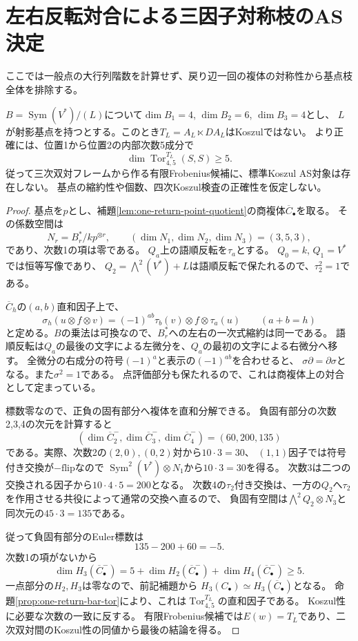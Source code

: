 \section{左右反転対合による三因子対称枝のAS決定}
\label{sec:partial-symmetric-as}
ここでは一般点の大行列階数を計算せず、戻り辺一回の複体の対称性から基点枝全体を排除する。

\begin{theorem}[基点を持つ三因子対称切断の普遍的非Koszul性]
\label{thm:partial-symmetric-basepoint-exclusion}
$B=\operatorname{Sym}(V^*)/(L)$について$\dim B_1=4$, $\dim B_2=6$, $\dim B_3=4$とし、
$L$が射影基点を持つとする。このとき$T_L=A_L\ltimes D A_L$はKoszulではない。
より正確には、位置1から位置2の内部次数5成分で
\[
 \dim\operatorname{Tor}^{T_L}_{4,5}(S,S)\geq5.
\]
従って三次双対フレームから作る有限Frobenius候補に、標準Koszul AS対象は存在しない。
基点の縮約性や個数、四次Koszul検査の正確性を仮定しない。
\end{theorem}
\begin{proof}
基点を$p$とし、補題\ref{lem:one-return-point-quotient}の商複体$\overline C_\bullet$を取る。
その係数空間は
\[
 N_r=B_r^*/k p^{\otimes r},\qquad
 (\dim N_1,\dim N_2,\dim N_3)=(3,5,3),
\]
であり、次数1の項は零である。
$Q_a$上の語順反転を$\tau_a$とする。
$Q_0=k$, $Q_1=V^*$では恒等写像であり、
$Q_2=\bigwedge^2(V^*)+L$は語順反転で保たれるので、$\tau_2^2=1$である。

$\overline C_h$の$(a,b)$直和因子上で、
\[
 \sigma_h(u\otimes f\otimes v)
   =(-1)^{ab}\tau_b(v)\otimes f\otimes\tau_a(u)
 \qquad(a+b=h)
\]
と定める。$B$の乗法は可換なので、$B_r^*$への左右の一次式縮約は同一である。
語順反転は$Q_a$の最後の文字による左微分を、$Q_a$の最初の文字による右微分へ移す。
全微分の右成分の符号$(-1)^a$と表示の$(-1)^{ab}$を合わせると、
$\sigma\partial=\partial\sigma$となる。また$\sigma^2=1$である。
点評価部分も保たれるので、これは商複体上の対合として定まっている。

標数零なので、正負の固有部分へ複体を直和分解できる。
負固有部分の次数2,3,4の次元を計算すると
\[
 (\dim\overline C_2^-,\dim\overline C_3^-,\dim\overline C_4^-)
 =(60,200,135)
\]
である。実際、次数2の$(2,0),(0,2)$対から$10\cdot3=30$、
$(1,1)$因子では符号付き交換が$-\mathrm{flip}$なので
$\operatorname{Sym}^2(V^*)\otimes N_1$から$10\cdot3=30$を得る。
次数3は二つの交換される因子から$10\cdot4\cdot5=200$となる。
次数4の$\tau_2$付き交換は、一方の$Q_2$へ$\tau_2$を作用させる共役によって通常の交換へ直るので、
負固有空間は$\bigwedge^2 Q_2\otimes N_3$と同次元の$45\cdot3=135$である。

従って負固有部分のEuler標数は
\[
 135-200+60=-5.
\]
次数1の項がないから
\[
 \dim H_3(\overline C_\bullet^-)
 =5+\dim H_2(\overline C_\bullet^-)+\dim H_4(\overline C_\bullet^-)
 \geq5.
\]
一点部分の$H_2,H_3$は零なので、前記補題から
$H_3(C_\bullet)\simeq H_3(\overline C_\bullet)$となる。
命題\ref{prop:one-return-bar-tor}により、これは$\operatorname{Tor}^{T_L}_{4,5}$の直和因子である。
Koszul性に必要な次数の一致に反する。
有限Frobenius候補では$E(w)=T_L$であり、二次双対間のKoszul性の同値から最後の結論を得る。
\end{proof}

